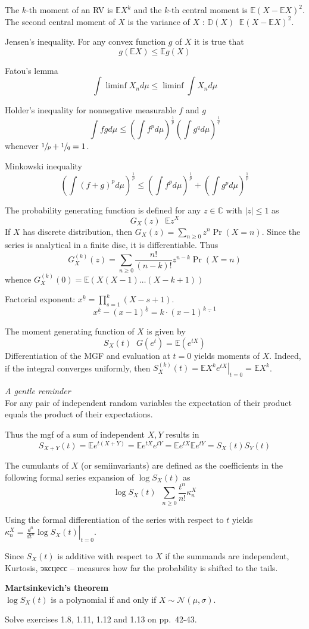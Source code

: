 \documentclass[a4paper]{article}
\newcommand{\brac}[1]{{\left ( #1 \right )}}
\newcommand{\induc}[1]{{\left . #1 \right \vert}}
\newcommand{\abs}[1]{{\left | #1 \right |}}
\newcommand{\Cplx}{\mathbb{C}}
\newcommand{\Ex}{\mathbb{E}}
\newcommand{\defn}{\mathop{\overset{\Delta}{=}}\nolimits}
\newcommand{\rus}[1]{\foreignlanguage{russian}{#1}}
\begin{document}
The $k$-th moment of an RV is $\Ex X^k$ and the $k$-th central moment is $\Ex\brac{ X - \Ex X}^2$.
The second central moment of $X$ is the variance of $X$ : $\mathbb{D}(X) \defn \Ex\brac{ X - \Ex X}^2$.

Jensen's inequality. For any convex function $g$ of $X$ it is true that 
\[g\brac{\Ex X}\leq \Ex g(X) \]

Fatou's lemma \[\int \liminf X_n d\mu \leq \liminf \int X_n d\mu\]

Holder's inequality for nonnegative measurable $f$ and $g$ \[\int fg d\mu \leq \brac{\int f^p d\mu}^\frac{1}{p}\brac{\int g^q d\mu}^\frac{1}{q}\] whenever $\sfrac{1}{p}+\sfrac{1}{q}=1$.

Minkowski inequality \[\brac{\int {(f+g)}^p d\mu}^\frac{1}{p}\leq \brac{\int f^p d\mu}^\frac{1}{p} + \brac{\int g^p d\mu}^\frac{1}{p}\]

The probability generating function is defined for any $z\in \Cplx$ with $\abs{z}\leq 1$ as \[G_X(z) \defn \Ex z^X\]
If $X$ has discrete distribution, then $G_X(z) = \sum_{n\geq 0} z^n \Pr(X=n)$.
Since the series is analytical in a finite disc, it is differentiable.
Thus \[G_X^{(k)}(z) = \sum_{n\geq 0} \frac{n!}{(n-k)!} z^{n-k} \Pr(X=n) \]
whence $G_X^{(k)}(0) = \Ex \brac{X(X-1)\ldots (X-k+1)}$

Factorial exponent: $x^{\underline{k}} = \prod_{s=1}^k (X-s+1)$.
\[x^{\underline{k}} - \brac{x-1}^{\underline{k}} = k \cdot \brac{x-1}^{\underline{k-1}} \]

The moment generating function of $X$ is given by \[S_X(t) \defn G(e^t) = \Ex(e^{tX})\]
Differentiation of the MGF and evaluation at $t=0$ yields moments of $X$.
Indeed, if the integral converges uniformly, then $S_X^{(k)}(t) = \induc{\Ex X^k e^{tX}}_{t=0} = \Ex X^k$.

\emph{A gentle reminder}\hfill \\ For any pair of independent random variables the expectation of their product equals the product of their expectations.

Thus the mgf of a sum of independent $X,Y$ results in \[S_{X+Y}(t) = \Ex e^{t(X+Y)} = \Ex e^{tX} e^{tY} = \Ex e^{tX} \Ex e^{tY} = S_X(t) S_Y(t)\]

The cumulants of $X$ (or semiinvariants) are defined as the coefficients in the following formal series expansion of $\log S_X(t)$ as
\[\log S_X(t) \defn \sum_{n\geq 0} \frac{t^n}{n!} \kappa_n^X\]

Using the formal differentiation of the series with respect to $t$ yields
$\kappa_n^X = \induc{\frac{d^n}{dt^n} \log S_X(t)}_{t=0}$.

Since $S_X(t)$ is additive with respect to $X$ if the summands are independent,
Kurtosis, \rus{эксцесс} -- measures how far the probability is shifted to the tails.

\textbf{Martsinkevich's theorem}\hfill\\
$\log S_X(t)$ is a polynomial if and only if $X\sim\mathcal{N}(\mu,\sigma)$.


Solve exercises 1.8, 1.11, 1.12 and 1.13 on pp.~42-43.

\end{document}
